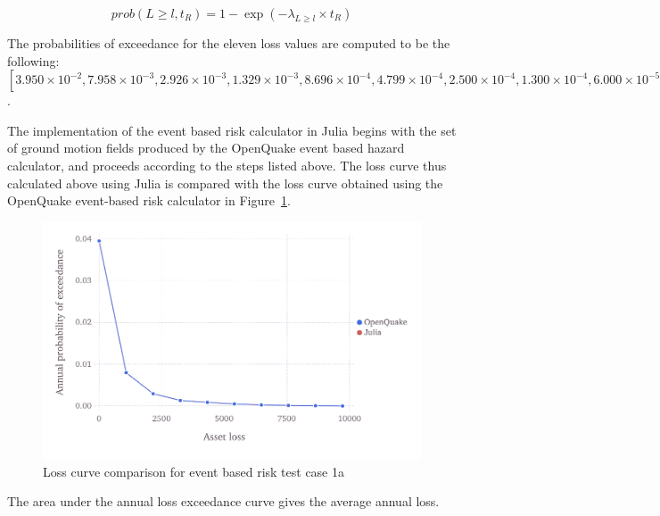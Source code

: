 \begin{equation}
	prob(L \geq l, t_R) = 1 - \exp (-\lambda_{L \geq l} \times t_R)
\end{equation}

The probabilities of exceedance for the eleven loss values are computed to be the following: $[3.950\times10^{-2}, 7.958\times10^{-3}, 2.926\times10^{-3}, 1.329\times10^{-3}, 8.696\times10^{-4}, 4.799\times10^{-4}, 2.500\times10^{-4}, 1.300\times10^{-4}, 6.000\times10^{-5}, 0.000]$.

The implementation of the event based risk calculator in Julia begins with the set of ground motion fields produced by the OpenQuake event based hazard calculator, and proceeds according to the steps listed above. The loss curve thus calculated above using Julia is compared with the loss curve obtained using the OpenQuake event-based risk calculator in Figure~\ref{fig:lc-ebr-1a}.

\begin{figure}[htbp]
\centering
\includegraphics[width=12cm]{qareport/figures/fig-lc-ebr-1a}
\caption{Loss curve comparison for event based risk test case 1a}
\label{fig:lc-ebr-1a}
\end{figure}

The area under the annual loss exceedance curve gives the average annual loss.